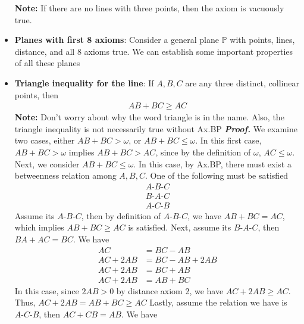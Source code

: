 \documentclass{report}
\begin{document}
\begin{itemize}
            \bigbreak \noindent 
            \textbf{Note:} If there are no lines with three points, then the axiom is vacuously true.
        \item \textbf{Planes with first 8 axioms}: Consider a general plane $\mathbb{P}$ with points, lines, distance, and all 8 axioms true. We can establish some important properties of all these planes
        \item \textbf{Triangle inequality for the line}: If $A,B,C$ are any three distinct, collinear points, then 
            \begin{align*}
                AB + BC \geq AC 
            \end{align*}
            \bigbreak \noindent 
            \textbf{Note:} Don't worry about why the word triangle is in the name. Also, the triangle inequality is not necessarily true without Ax.BP
            \bigbreak \noindent 
            \textbf{\textit{Proof.}} We examine two cases, either $ AB + BC > \omega$, or $AB + BC \leq \omega$. In this first case, $AB +BC > \omega$ implies $AB +BC > AC$, since by the definition of $\omega$, $AC \leq \omega$.
            \bigbreak \noindent 
            Next, we consider $AB + BC \leq \omega$. In this case, by Ax.BP, there must exist a betweenness relation among $A,B,C$. One of the following must be satisfied
            \begin{align*}
                A\text{-}B\text{-}C \\
                B\text{-}A\text{-}C \\
                A\text{-}C\text{-}B
            \end{align*}
            \bigbreak \noindent 
            Assume its $ A\text{-}B\text{-}C$, then by definition of $ A\text{-}B\text{-}C$, we have $AB + BC = AC$, which implies $AB + BC \geq AC$ is satisfied.
            \bigbreak \noindent 
            Next, assume its $ B\text{-}A\text{-}C$, then $BA + AC = BC$. We have
            \begin{align*}
                AC &= BC - AB \\
                AC + 2AB &= BC - AB + 2AB \\
                AC + 2AB &= BC + AB \\
                AC + 2AB &= AB + BC
            \end{align*}
            In this case, since $2AB > 0$ by distance axiom 2, we have $AC + 2AB \geq AC$. Thus, $AC + 2AB = AB + BC \geq AC $ 
            \bigbreak \noindent 
            Lastly, assume the relation we have is $ A\text{-}C\text{-}B$, then $AC + CB = AB$. We have

\end{itemize}
\end{document}
